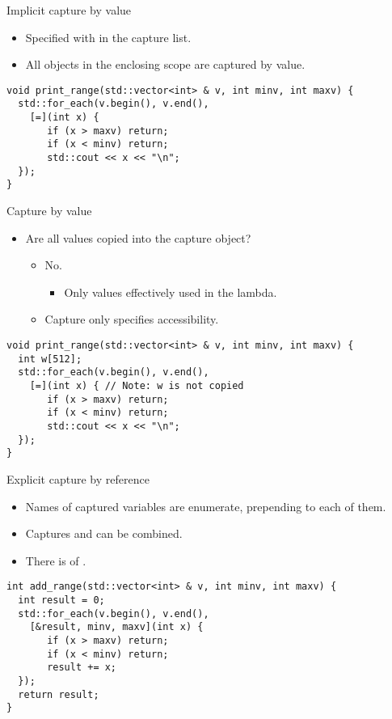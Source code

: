 \begin{frame}[t,fragile]{Implicit capture by value}
  \begin{itemize}
    \item Specified with \cppid{=} in the capture list.
    \item All objects in the enclosing scope are captured by value.
  \end{itemize}
\pause
\begin{lstlisting}
void print_range(std::vector<int> & v, int minv, int maxv) {
  std::for_each(v.begin(), v.end(),
    [=](int x) { 
       if (x > maxv) return;
       if (x < minv) return;
       std::cout << x << "\n";
  });
}
\end{lstlisting}
\end{frame}

\begin{frame}[t,fragile]{Capture by value}
\begin{itemize}
  \item Are all values copied into the capture object?
    \begin{itemize}
      \pause
      \item No.
        \begin{itemize}
          \item Only values effectively used in the lambda.
        \end{itemize}
        \item Capture only specifies accessibility.
    \end{itemize}
\end{itemize}

\pause
\begin{lstlisting}
void print_range(std::vector<int> & v, int minv, int maxv) {
  int w[512];
  std::for_each(v.begin(), v.end(),
    [=](int x) { // Note: w is not copied
       if (x > maxv) return;
       if (x < minv) return;
       std::cout << x << "\n";
  });
}
\end{lstlisting}
\end{frame}

\begin{frame}[t,fragile]{Explicit capture by reference}
  \begin{itemize}
    \item Names of captured variables are enumerate, 
          prepending \cppid{\&} to each of them.
    \item Captures  and  can be combined.
    \item There is  of 
          .
  \end{itemize}
\pause
\begin{lstlisting}[escapechar=@]
int add_range(std::vector<int> & v, int minv, int maxv) {
  int result = 0;
  std::for_each(v.begin(), v.end(),
    [&result, minv, maxv](int x) {
       if (x > maxv) return;
       if (x < minv) return;
       result += x;
  });
  return result;
}
\end{lstlisting}
\end{frame}

